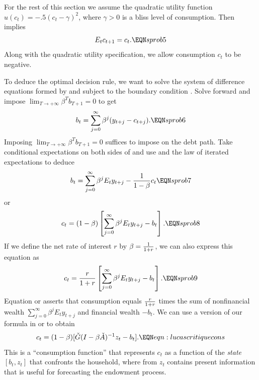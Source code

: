   For the rest of this section we assume
the quadratic  utility function
$u(c_t) =  -.5 (c_t - \gamma)^2$,
where $\gamma >0$ is a bliss level of consumption. Then
 implies
%
$$ E_t c_{t+1} = c_t . \EQN sprob5 $$
Along  with the quadratic utility specification, we allow consumption
$c_t$ to be negative.


 To deduce the optimal decision rule, we want to solve the system
of difference equations formed by  and  
subject to the boundary condition .   
Solve  forward and impose $\lim_{T\rightarrow +\infty} \beta^T b_{T+1} =0$ to get
$$ b_t = \sum_{j=0}^\infty \beta^j (y_{t+j} - c_{t+j}) .  \EQN sprob6 $$
Imposing $\lim_{T\rightarrow +\infty} \beta^T b_{T+1} =0$ suffices to impose  on the debt
path.
Take conditional expectations on both sides of  and use 
and the law of iterated expectations to deduce
$$ b_t = \sum_{j=0}^\infty \beta^j E_t y_{t+j} - {1 \over 1-\beta} c_t
\EQN sprob7 $$
 or
$$ c_t = (1-\beta)
\left[ \sum_{j=0}^\infty \beta^j E_t y_{t+j} - b_t\right].
 \EQN sprob8  $$
If we define the net rate of interest $r$ by $\beta ={1 \over 1+r}$, we can
also express this
equation as
$$ c_t = {r \over 1+r}
\left[ \sum_{j=0}^\infty \beta^j E_t y_{t+j} - b_t\right]. \EQN sprob9 $$
Equation  or  asserts that consumption  equals
 ${r \over 1+r}$ times
the sum of nonfinancial wealth $
\sum_{j=0}^\infty \beta^j E_t y_{t+j}$ and financial
wealth $-b_t$.   We can use a version of  our formula  in   or  to obtain
$$  c_t  = (1-\beta) [ \check G(I-\beta \check A)^{-1} z_t - b_t ]  .  \EQN eqn:lucascritiquecons $$
This is a ``consumption function'' that   represents
$c_t$  as a function of the {\it state\/} $[b_t, z_t]$ that
 confronts the household, where  from  $z_t$ contains present
information that is useful for forecasting the endowment process.



